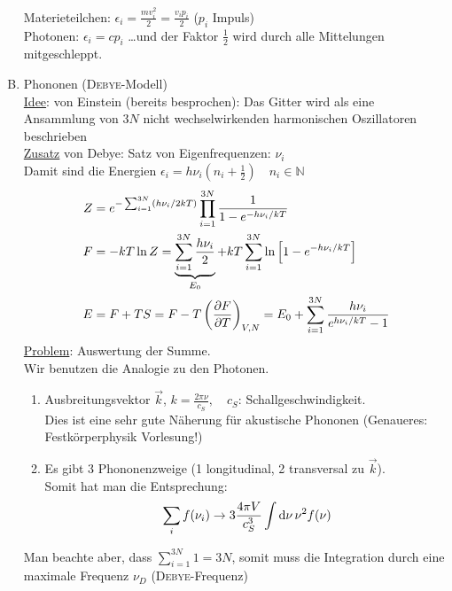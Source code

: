 \begin{enumerate}[A)]
    Materieteilchen: $\epsilon_i = \frac{m v_i^2}{2} = \frac{v_i p_i}{2}$ ($p_i$ Impuls)\\
    Photonen: $\epsilon_i = c p_i$ \ldots und der Faktor $\frac{1}{2}$ wird durch alle Mittelungen mitgeschleppt.
    \item Phononen (\textsc{Debye}-Modell) \\
    \underline{Idee}: von Einstein (bereits besprochen): Das Gitter wird als eine Ansammlung von $3N$ nicht wechselwirkenden
    harmonischen Oszillatoren beschrieben \\
    \underline{Zusatz} von Debye: Satz von Eigenfrequenzen: $\nu_i$ \\
    Damit sind die Energien $\epsilon_i = h \nu_i \left( n_i + \frac{1}{2} \right) \quad n_i \in \mathbb{N}$
    \begin{equation}
        \begin{split}
            Z &= e^{- \sum_{i=1}^{3N} \left( h \nu_i / 2 k T \right)} \prod_{i=1}^{3N} \frac{1}{1 - e^{- h \nu_i / k T}} \\
            F &= - k T \ln Z = \underbrace{\sum_{i=1}^{3N} \frac{h \nu_i}{2}}_{E_0} + k T \sum_{i=1}^{3N} \ln \left[ 1 - e^{- h \nu_i / k T} \right] \\
            E &= F + T S = F - T \left( \frac{\partial F}{\partial T} \right)_{V, N} = E_0 + \sum_{i=1}^{3N} \frac{h \nu_i}{e^{h \nu_i/kT} -1}
        \end{split}
    \end{equation}
    \underline{Problem}: Auswertung der Summe. \\
    Wir benutzen die Analogie zu den Photonen.
    \begin{enumerate}
        \item Ausbreitungsvektor $\vec{k}$, $k = \frac{2 \pi \nu}{c_S}, \quad c_S$: Schallgeschwindigkeit. \\
        Dies ist eine sehr gute Näherung für akustische Phononen (Genaueres: Festkörperphysik Vorlesung!)
        \item Es gibt 3 Phononenzweige (1 longitudinal, 2 transversal zu $\vec{k}$). \\
        Somit hat man die Entsprechung:
        \begin{equation}
            \sum_i f(\nu_i) \rightarrow 3 \frac{4 \pi V}{c_S^3} \int \mathrm{d} \nu \, \nu^2 f(\nu)
        \end{equation}
    \end{enumerate}
    Man beachte aber, dass $ \sum_{i=1}^{3N} 1 = 3 N$, somit muss die Integration durch eine maximale Frequenz $\nu_D$ (\textsc{Debye}-Frequenz)

\end{enumerate}
